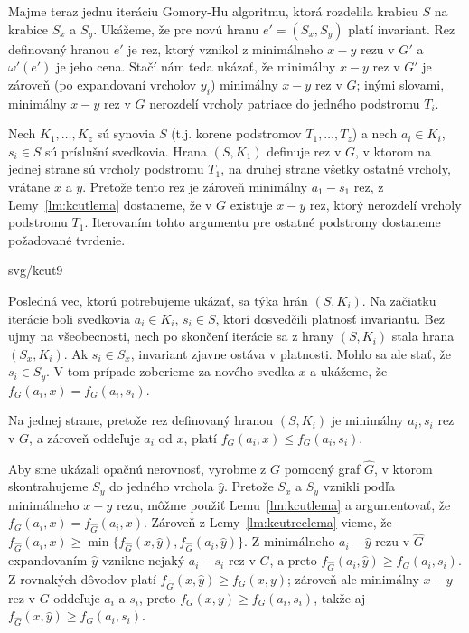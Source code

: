 Majme teraz jednu iteráciu Gomory-Hu algoritmu, ktorá rozdelila krabicu $S$ na krabice $S_x$ a $S_y$.
Ukážeme, že pre novú hranu $e'=(S_x,S_y)$ platí invariant. Rez definovaný hranou $e'$ je rez, ktorý vznikol
z minimálneho $x-y$ rezu v $G'$ a $\omega'(e')$ je jeho cena. Stačí nám teda ukázať, že minimálny $x-y$ rez v $G'$
je zároveň (po expandovaní vrcholov $y_i$) minimálny $x-y$ rez v $G$; inými slovami, minimálny $x-y$ rez v $G$
nerozdelí vrcholy patriace do jedného podstromu $T_i$.

Nech $K_1,\ldots,K_z$ sú synovia $S$ (t.j. korene podstromov $T_1,\ldots,T_z$) a 
nech $a_i\in K_i$, $s_i\in S$ sú príslušní svedkovia. 
Hrana $(S,K_1)$ definuje rez v $G$, 
v ktorom na jednej strane sú vrcholy podstromu $T_1$, na druhej strane všetky ostatné vrcholy, vrátane $x$ a $y$.
Pretože tento rez je zároveň minimálny $a_1-s_1$ rez, z Lemy~\ref{lm:kcutlema}
dostaneme, že v $G$ existuje $x-y$ rez, ktorý nerozdelí vrcholy podstromu $T_1$. 
Iterovaním tohto argumentu pre ostatné podstromy dostaneme požadované tvrdenie.

\begin{minipage}[t]{0.3\textwidth}
  \vskip 0pt
  \begin{myfig}{\textwidth}{svg/kcut9}
  \end{myfig}
\end{minipage}\hfill
\begin{minipage}[t]{.6\textwidth}
  \vskip 0pt
Posledná vec, ktorú potrebujeme ukázať, sa týka hrán $(S,K_i)$. Na začiatku iterácie boli svedkovia
$a_i\in K_i$, $s_i\in S$, ktorí dosvedčili platnosť invariantu. Bez ujmy na všeobecnosti, nech
po skončení iterácie sa z hrany $(S,K_i)$ stala hrana $(S_x,K_i)$. Ak $s_i\in S_x$, invariant 
zjavne ostáva v platnosti. Mohlo sa ale stať, že $s_i\in S_y$.
V tom prípade zoberieme za nového svedka $x$ a ukážeme, že $f_G(a_i,x)=f_G(a_i,s_i)$.

Na jednej strane, pretože rez definovaný hranou $(S,K_i)$ je minimálny $a_i,s_i$ rez v $G$, a zároveň
oddeľuje $a_i$ od $x$, platí $f_G(a_i,x)\le f_G(a_i,s_i)$.
\end{minipage}

Aby sme ukázali opačnú nerovnosť, vyrobme z $G$  pomocný graf $\hat{G}$, 
v ktorom skontrahujeme $S_y$ do jedného vrchola $\hat{y}$. Pretože $S_x$ a $S_y$ vznikli podľa minimálneho $x-y$ rezu,
môžme použiť Lemu~\ref{lm:kcutlema} a argumentovať, že $f_G(a_i,x)=f_{\hat{G}}(a_i,x)$.
Zároveň z Lemy~\ref{lm:kcutreclema} vieme, že $f_{\hat{G}}(a_i,x)\ge\min\{f_{\hat{G}}(x,\hat{y}), 
f_{\hat{G}}(a_i,\hat{y})\}$.
Z minimálneho $a_i-\hat{y}$ rezu v $\hat{G}$ expandovaním $\hat{y}$ vznikne nejaký  $a_i-s_i$ rez v $G$, a preto
$f_{\hat{G}}(a_i,\hat{y})\ge f_G(a_i,s_i)$.
Z rovnakých dôvodov platí $f_{\hat{G}}(x,\hat{y})\ge f_G(x,y)$; zároveň ale minimálny $x-y$ rez v $G$
oddeľuje $a_i$ a $s_i$, preto $f_G(x,y)\ge f_G(a_i,s_i)$, takže aj $f_{\hat{G}}(x,\hat{y})\ge f_G(a_i,s_i)$.


